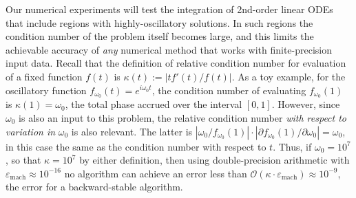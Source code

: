 \documentclass[10pt]{article}
\newcommand{\eg}{{\it e.g.\ }}
\newcommand{\bigO}{{\mathcal O}}
\newcommand{\om}{\omega}
\begin{document}
Our numerical experiments will test the integration of 2nd-order linear
ODEs that include regions with highly-oscillatory solutions.
In such regions the condition number of the problem itself becomes
large, and this limits the achievable accuracy of \emph{any}
numerical method that works with finite-precision input data.
Recall \cite[Ch.~6]{GCbook}
that the definition of relative condition number for evaluation
of a fixed function $f(t)$ is $\kappa(t) := |tf'(t)/f(t)|$.
As a toy example,
for the oscillatory function $f_{\omega_0}(t) = e^{i\om_0t}$, 
the condition number of evaluating $f_{\omega_0}(1)$ is $\kappa(1) = \om_0$,
the total phase accrued
over the interval $[0,1]$.
However, since $\om_0$ is also an input to this problem,
the relative condition number
\emph{with respect to variation in} $\om_0$ is also relevant.
The latter is
$|\om_0/f_{\om_0}(1)| \cdot |\partial f_{\om_0}(1)/\partial \om_0| = \om_0$,
in this case the same as the condition number with respect to $t$.
Thus, if $\om_0=10^{7}$, so that $\kappa=10^7$ by either %
definition,
then using double-precision arithmetic with
$\varepsilon_{\mathrm{mach}} \approx 10^{-16}$
no algorithm can achieve an error less than $\bigO(\kappa\cdot \varepsilon_{\mathrm{mach}}) \approx 10^{-9}$,
the error for a backward-stable algorithm.
\end{document}
